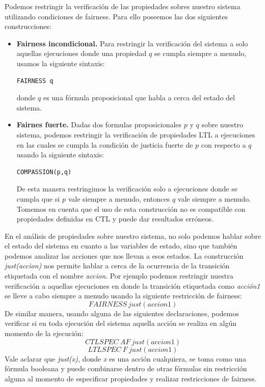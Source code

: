 \documentclass[titlepage, 12pt]{book}
\begin{document}
Podemos restringir la verificaci\'on de las propiedades sobres nuestro sistema utilizando condiciones de fairness. Para ello poseemos las dos siguientes construcciones:
\begin{itemize}
\item \textbf{Fairness incondicional.} Para restringir la verificaci\'on del sistema a solo aquellas ejecuciones donde una propiedad $q$ se cumpla siempre a menudo, usamos la siguiente sintaxis: \begin{verbatim}FAIRNESS q\end{verbatim} donde $q$ es una f\'ormula proposicional que habla a cerca del estado del sistema.
\item \textbf{Fairnes fuerte.} Dadas dos formulas proposicionales $p$ y $q$ sobre nuestro sistema, podemos restringir la verificaci\'on de propiedades LTL a ejecuciones en las cuales se cumpla la condici\'on de justicia fuerte de $p$ con respecto a $q$ usando la siguiente sintaxis: \begin{verbatim}COMPASSION(p,q)\end{verbatim} De esta manera restringimos la verificaci\'on solo a ejecuciones donde se cumpla que si $p$ vale siempre a menudo, entonces $q$ vale siempre a menudo. Tomemos en cuenta que el uso de esta construcci\'on no es compatible con propiedades definidas en CTL y puede dar resultados err\'oneos.
\end{itemize}

En el an\'alisis de propiedades sobre nuestro sistema, no solo podemos hablar sobre el estado del sistema en cuanto a las variables de estado, sino que tambi\'en podemos analizar las acciones que nos llevan a esos estados. La construcci\'on \textit{just(accion)} nos permite hablar a cerca de la ocurrencia de la transici\'on etiquetada con el nombre \textit{accion}. Por ejemplo podemos restringir nuestra verificaci\'on a aquellas ejecuciones en donde la transici\'on etiquetada como \textit{acci\'on1} se lleve a cabo siempre a menudo usando la siguiente restricci\'on de fairness:
$$FAIRNESS~just(accion1)$$
De similar manera, usando alguna de las siguientes declaraciones, podemos verificar si en toda ejecuci\'on del sistema aquella acci\'on se realiza en alg\'un momento de la ejecuci\'on:
$$CTLSPEC~AF~just(accion1)$$
$$LTLSPEC~F~just(accion1)$$
Vale aclarar que \textit{just(x)}, donde \textit{x} es una acci\'on cualquiera, se toma como una f\'ormula booleana y puede combinarse dentro de otras f\'ormulas sin restricci\'on alguna al momento de especificar propiedades y realizar restricciones de fairness.
\end{document}

